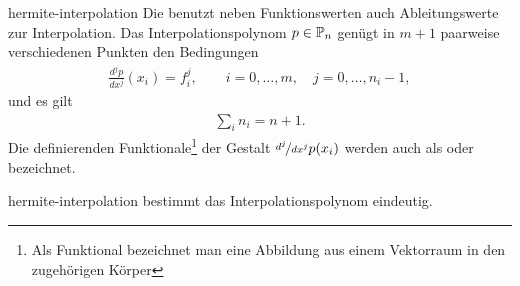 \begin{Definition}{hermite-interpolation}
  Die  benutzt neben Funktionswerten
  auch Ableitungswerte zur Interpolation. Das Interpolationspolynom
  $p\in \P_n$ genügt in $m+1$ paarweise verschiedenen Punkten den
  Bedingungen
  \begin{gather}
    \frac{d^j p}{dx^j}(x_i) = f_i^{j},
    \qquad i = 0,\dots, m, \quad j=0,\dots,n_i-1,
  \end{gather}
  und es gilt
  \begin{gather}
    \sum_{i} n_i = n+1.
  \end{gather}
  Die definierenden Funktionale\footnote{Als Funktional bezeichnet man
    eine Abbildung aus einem Vektorraum in den zugehörigen Körper} der Gestalt
  $\nicefrac{d^j}{dx^j} p(x_i)$ werden auch als 
  oder  bezeichnet.
\end{Definition}

\begin{Satz}{hermite-interpolation}
   bestimmt das
  Interpolationspolynom eindeutig.
\end{Satz}


